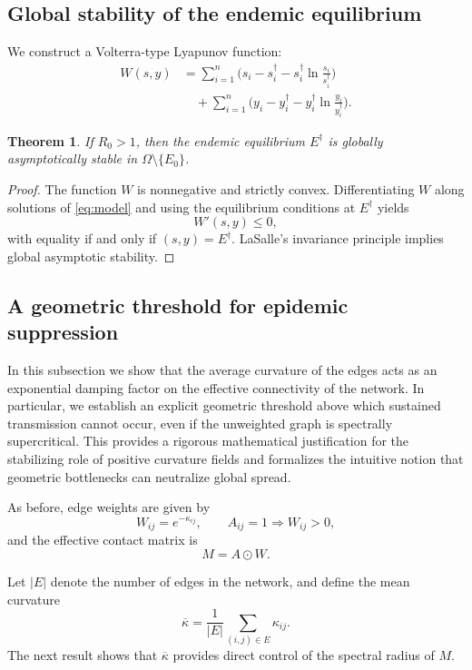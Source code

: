 \documentclass[final,3p,times,twocolumn]{elsarticle}
\newtheorem{theorem}{Theorem}
\begin{document}
\subsection{Global stability of the endemic equilibrium}

We construct a Volterra-type Lyapunov function:
\[
\begin{aligned}
    W(s,y) &= 
    \sum_{i=1}^n 
    \Big( s_i - s_i^\dagger - s_i^\dagger \ln \frac{s_i}{s_i^\dagger} \Big)
\\ &\quad+
    \sum_{i=1}^n 
    \Big( y_i - y_i^\dagger - y_i^\dagger \ln \frac{y_i}{y_i^\dagger} \Big).
\end{aligned}
\]

\begin{theorem}
If $R_0>1$, then the endemic equilibrium $E^\dagger$ is globally asymptotically stable in $\Omega \setminus \{E_0\}$.
\end{theorem}

\begin{proof}
The function $W$ is nonnegative and strictly convex.
Differentiating $W$ along solutions of \eqref{eq:model} and using the equilibrium
conditions at $E^\dagger$ yields
\[
    W'(s,y) \le 0,
\]
with equality if and only if $(s,y)=E^\dagger$.
LaSalle's invariance principle implies global asymptotic stability.
\end{proof}

\subsection{A geometric threshold for epidemic suppression}

In this subsection we show that the average curvature of the edges acts as an
exponential damping factor on the effective connectivity of the network.
In particular, we establish an explicit geometric threshold above which sustained
transmission cannot occur, even if the unweighted graph is spectrally
supercritical.  
This provides a rigorous mathematical justification for the stabilizing role of
positive curvature fields and formalizes the intuitive notion that geometric
bottlenecks can neutralize global spread.

As before, edge weights are given by
\[
    W_{ij} = e^{-\kappa_{ij}},
\qquad 
A_{ij}=1 \Rightarrow W_{ij}>0,
\]
and the effective contact matrix is
\[
    M = A \odot W.
\]

Let $|E|$ denote the number of edges in the network, and define the mean
curvature
\[
    \overline{\kappa}
    =
    \frac{1}{|E|}\sum_{(i,j)\in E} \kappa_{ij}.
\]
The next result shows that $\overline{\kappa}$ provides direct control of the
spectral radius of $M$.
\end{document}
